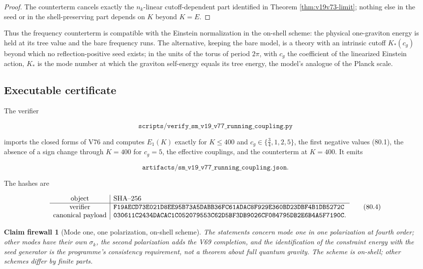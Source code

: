 \documentclass[11pt]{article}
\newtheorem{firewall}[theorem]{Claim firewall}
\theoremstyle{remark}
\begin{document}
\begin{proof}
The counterterm cancels exactly the \(n_k\)-linear cutoff-dependent
part identified in Theorem \ref{thm:v19v73-limit}; nothing else in
the seed or in the shell-preserving part depends on \(K\) beyond
\(K=E\).
\end{proof}

Thus the frequency counterterm is compatible with the Einstein
normalization in the on-shell scheme: the physical one-graviton energy
is held at its tree value and the bare frequency runs.  The
alternative, keeping the bare model, is a theory with an intrinsic
cutoff \(K_*(c_g)\) beyond which no reflection-positive seed exists;
in the units of the torus of period \(2\pi\), with \(c_g\) the
coefficient of the linearized Einstein action, \(K_*\) is the mode
number at which the graviton self-energy equals its tree energy, the
model's analogue of the Planck scale.

\subsection{Executable certificate}

The verifier

\[
 \texttt{scripts/verify\_sm\_v19\_v77\_running\_coupling.py}         \tag{80.2}
\]

imports the closed forms of V76 and computes \(E_1(K)\) exactly for
\(K\leq400\) and \(c_g\in\{\tfrac34,1,2,5\}\), the first negative
values (80.1), the absence of a sign change through \(K=400\) for
\(c_g=5\), the effective couplings, and the counterterm at
\(K=400\).  It emits

\[
 \texttt{artifacts/sm\_v19\_v77\_running\_coupling.json}.            \tag{80.3}
\]

The hashes are

\[
\begin{array}{c|l}
\hbox{object}&\hbox{SHA--256}\\ \hline
\hbox{verifier}&
\texttt{F19AECD73E021D8EE95B73A5DABB36FC61ADAC8F929E360BD23DBF4B1DB5272C}\\
\hbox{canonical payload}&
\texttt{030611C2434DACAC1C052079553C62D5BF3DB9026CF084795DB2E6B4A5F7190C}.
\end{array}                                                     \tag{80.4}
\]

\begin{firewall}[Mode one, one polarization, on-shell scheme]
\label{fire:v19v77}
The statements concern mode one in one polarization at fourth order;
other modes have their own \(\sigma_k\), the second polarization adds
the V69 completion, and the identification of the constraint energy
with the seed generator is the programme's consistency requirement, not
a theorem about full quantum gravity.  The scheme is on-shell; other
schemes differ by finite parts.
\end{firewall}
\end{document}
